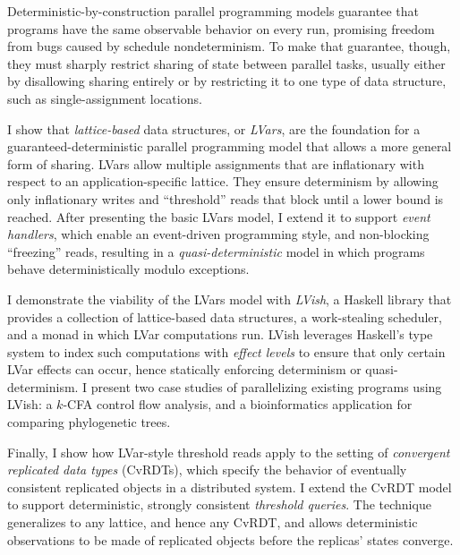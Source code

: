 Deterministic-by-construction parallel programming models guarantee
that programs have the same observable behavior on every run,
promising freedom from bugs caused by schedule nondeterminism.  To
make that guarantee, though, they must sharply restrict sharing of
state between parallel tasks, usually either by disallowing sharing
entirely or by restricting it to one type of data structure, such as
single-assignment locations.

I show that \emph{lattice-based} data structures, or \emph{LVars}, are the
foundation for a guaranteed-deterministic parallel programming model
that allows a more general form of sharing.  LVars allow multiple
assignments that are inflationary with respect to an
application-specific lattice.  They ensure determinism by allowing
only inflationary writes and ``threshold'' reads that block until a
lower bound is reached.  After presenting the basic LVars model, I
extend it to support \emph{event handlers}, which enable an event-driven
programming style, and non-blocking ``freezing'' reads, resulting in a
\emph{quasi-deterministic} model in which programs behave deterministically
modulo exceptions.

I demonstrate the viability of the LVars model with \emph{LVish}, a Haskell
library that provides a collection of lattice-based data structures, a
work-stealing scheduler, and a monad in which LVar computations run.
LVish leverages Haskell's type system to index such computations with
\emph{effect levels} to ensure that only certain LVar effects can occur,
hence statically enforcing determinism or quasi-determinism. I present
two case studies of parallelizing existing programs using LVish: a
$k$-CFA control flow analysis, and a bioinformatics application for
comparing phylogenetic trees.

Finally, I show how LVar-style threshold reads apply to the setting of
\emph{convergent replicated data types} (CvRDTs), which specify the behavior
of eventually consistent replicated objects in a distributed system.
I extend the CvRDT model to support deterministic, strongly consistent
\emph{threshold queries}.  The technique generalizes to any lattice, and
hence any CvRDT, and allows deterministic observations to be made of
replicated objects before the replicas' states converge.

